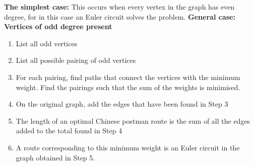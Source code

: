 \documentclass[12pt]{article}
\theoremstyle{definition}
\begin{document}
\textbf{The simplest case:}
This occurs when every vertex in the graph has even degree, for in this case an Euler
circuit solves the problem. 
\textbf{General case: Vertices of odd degree present}
\begin{enumerate}
  \item List all odd vertices
  \item List all possible pairing of odd vertices
  \item For each pairing, find paths that connect the vertices with the minimum weight. Find the pairings such that the sum of the weights is minimised.
  \item On the original graph, add the edges that have been found in Step 3
  \item The length of an optimal Chinese postman route is the sum of all the edges added to the total found in Step 4
  \item A route corresponding to this minimum weight is an Euler circuit in the graph obtained in Step 5.
\end{enumerate}
\end{document}
